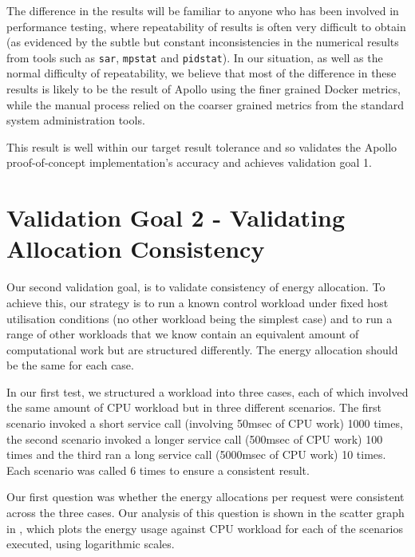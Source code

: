 The difference in the results will be familiar to anyone who has been involved in performance testing, where repeatability of results is often very difficult to obtain (as evidenced by the subtle but constant inconsistencies in the numerical results from tools such as \texttt{sar}, \texttt{mpstat} and \texttt{pidstat}).  In our situation, as well as the normal difficulty of repeatability, we believe that most of the difference in these results is likely to be the result of Apollo using the finer grained Docker metrics, while the manual process relied on the coarser grained metrics from the standard system administration tools. 

This result is well within our target result tolerance and so validates the Apollo proof-of-concept implementation's accuracy and achieves validation goal 1.

\section{Validation Goal 2 - Validating Allocation Consistency}
\label{section:validatingconsistency}

Our second validation goal, is to validate consistency of energy allocation.  To achieve this, our strategy is to run a known control workload under fixed host utilisation conditions (no other workload being the simplest case) and to run a range of other workloads that we know contain an equivalent amount of computational work but are structured differently.  The energy allocation should be the same for each case.

In our first test, we structured a workload into three cases, each of which involved the same amount of CPU workload but in three different scenarios.  The first scenario invoked a short service call (involving 50msec of CPU work) 1000 times, the second scenario invoked a longer service call (500msec of CPU work) 100 times and the third ran a long service call (5000msec of CPU work) 10 times.  Each scenario was called 6 times to ensure a consistent result.

Our first question was whether the energy allocations per request were consistent across the three cases.  Our analysis of this question is shown in the scatter graph in , which plots the energy usage against CPU workload for each of the scenarios executed, using logarithmic scales.

